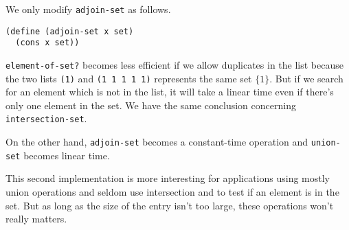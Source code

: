 \documentclass[a4paper,12pt]{article}
\begin{document}
We only modify \lstinline!adjoin-set! as follows.
\begin{lstlisting}
(define (adjoin-set x set)
  (cons x set))
\end{lstlisting}
\lstinline!element-of-set?! becomes less efficient if we allow
duplicates in the list because the two lists \lstinline!(1)! and
\lstinline!(1 1 1 1 1)! represents the same set $\{1\}$.  But if we
search for an element which is not in the list, it will take a linear
time even if there's only one element in the set.  We have the same
conclusion concerning \lstinline!intersection-set!.

On the other hand, \lstinline!adjoin-set! becomes a constant-time
operation and \lstinline!union-set! becomes linear time.

\medskip
This second implementation is more interesting for applications using
mostly union operations and seldom use intersection and to test if an
element is in the set.  But as long as the size of the entry isn't too
large, these operations won't really matters.
\end{document}
